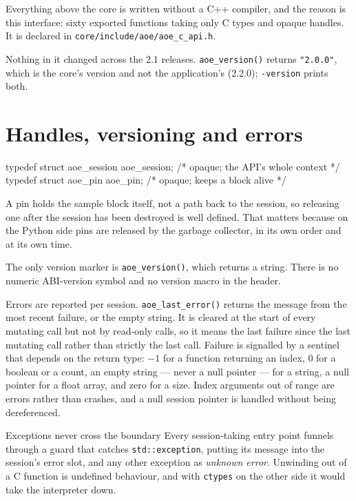 \documentclass[11pt,a4paper,oneside]{report}
\newcommand{\appver}{2.2.0}
\newcommand{\code}[1]{\texttt{#1}}
\begin{document}
Everything above the core is written without a C++ compiler, and the reason is
this interface: sixty exported functions taking only C types and opaque handles.
It is declared in \code{core/include/aoe/aoe\_c\_api.h}.

Nothing in it changed across the 2.1 releases. \code{aoe\_version()} returns
\code{"2.0.0"}, which is the core's version and not the application's
(\appver); \code{-version} prints both.

\section{Handles, versioning and errors}

\begin{aoecode}
typedef struct aoe_session aoe_session;   /* opaque; the API's whole context */
typedef struct aoe_pin     aoe_pin;       /* opaque; keeps a block alive */
\end{aoecode}

A pin holds the sample block itself, not a path back to the session, so
releasing one after the session has been destroyed is well defined. That matters
because on the Python side pins are released by the garbage collector, in its
own order and at its own time.

The only version marker is \code{aoe\_version()}, which returns a string. There
is no numeric ABI-version symbol and no version macro in the header.

Errors are reported per session. \code{aoe\_last\_error()} returns the message
from the most recent failure, or the empty string. It is cleared at the start of
every mutating call but not by read-only calls, so it means the last failure
since the last mutating call rather than strictly the last call. Failure is
signalled by a sentinel that depends on the return type: $-1$ for a function
returning an index, 0 for a boolean or a count, an empty string --- never a null
pointer --- for a string, a null pointer for a float array, and zero for a size.
Index arguments out of range are errors rather than crashes, and a null session
pointer is handled without being dereferenced.

\begin{aoenote}{Exceptions never cross the boundary}
Every session-taking entry point funnels through a guard that catches
\code{std::exception}, putting its message into the session's error slot, and
any other exception as \emph{unknown error}. Unwinding out of a C function is
undefined behaviour, and with \code{ctypes} on the other side it would take the
interpreter down.
\end{aoenote}
\end{document}
